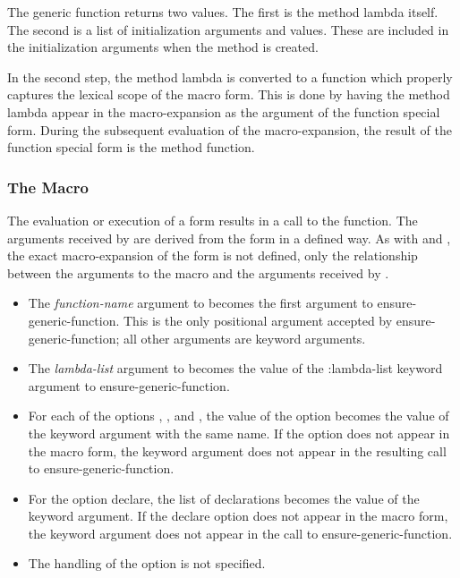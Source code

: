 The generic function  returns two values. The first is
the method lambda itself. The second is a list of initialization arguments and
values. These are included in the initialization arguments when the method is
created.

In the second step, the method lambda is converted to a function which properly
captures the lexical scope of the macro form. This is done by having the method
lambda appear in the macro-expansion as the argument of the function special
form. During the subsequent evaluation of the macro-expansion, the result of the
function special form is the method function.

\subsubsection{The  Macro}

The evaluation or execution of a  form results in a call to the
 function. The arguments received by
 are derived from the  form in a defined
way. As with  and , the exact macro-expansion of the 
form is not defined, only the relationship between the arguments to the macro
and the arguments received by .


  \begin{itemize}
  \item The \emph{function-name} argument to  becomes the first
    argument to ensure-generic-function. This is the only positional argument
    accepted by ensure-generic-function; all other arguments are keyword
    arguments.

  \item The \emph{lambda-list} argument to  becomes the value of
    the :lambda-list keyword argument to ensure-generic-function.

  \item For each of the options ,
    ,  and ,
    the value of the option becomes the value of the keyword argument with the
    same name. If the option does not appear in the macro form, the keyword
    argument does not appear in the resulting call to ensure-generic-function.

  \item For the option declare, the list of declarations becomes the value of
    the  keyword argument. If the declare option does not
    appear in the macro form, the  keyword argument does not
    appear in the call to ensure-generic-function.

  \item The handling of the  option is not specified.
  \end{itemize}


